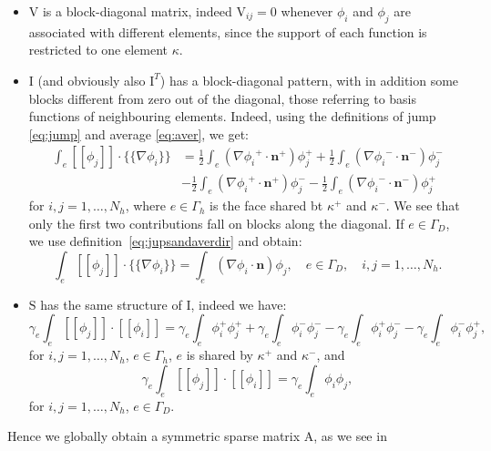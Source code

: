 \documentclass[12pt, a4paper]{article}
\theoremstyle{definition}
\theoremstyle{plain}
\theoremstyle{plain}
\theoremstyle{definition}
\begin{document}
\begin{itemize}
	\item $\mathrm{V}$ is a block-diagonal matrix, indeed 
	$\mathrm{V}_{ij} = 0$ 
	whenever $\phi_i$ and $\phi_j$ are associated with different elements, 
	since the support of each function is restricted to one element $\kappa$.
	\item $\mathrm{I}$ (and obviously also $\mathrm{I}^T$) has a block-diagonal 
	pattern, with in addition some blocks different from zero out of the 
	diagonal, those referring to basis functions of neighbouring elements. 
	Indeed, using the definitions of jump \eqref{eq:jump} and average 
	\eqref{eq:aver}, we get:
	\begin{align*}
		\int_e [\![\phi_j]\!] \cdot \{\!\!\{ \nabla \phi_i \}\!\!\} &=
		\frac{1}{2} \int_e (\nabla{\phi_i}^+ \cdot \mathbf{n}^+ )\phi_j^+
		+ \frac{1}{2} \int_e (\nabla{\phi_i}^- \cdot \mathbf{n}^- )\phi_j^-\\
		&- \frac{1}{2} \int_e (\nabla{\phi_i}^+ \cdot \mathbf{n}^+ )\phi_j^-
		- \frac{1}{2} \int_e (\nabla{\phi_i}^- \cdot \mathbf{n}^- )\phi_j^+
	\end{align*}
	for $i,j = 1,\dots, N_h$, where $e \in \Gamma_h$ is the face shared bt 
	$\kappa^+$ and $\kappa^-$. We see that only the first two contributions 
	fall on blocks along the diagonal. If $e \in \Gamma_D$, we use 
	definition~\eqref{eq:jupsandaverdir} and obtain:
	\begin{equation*}
		\int_e [\![\phi_j]\!] \cdot \{\!\!\{ \nabla \phi_i \}\!\!\} = \int_e 
		(\nabla{\phi_i} \cdot \mathbf{n} )\phi_j, \quad e \in \Gamma_{D}, 
		\quad i,j = 1,\dots, N_h.
	\end{equation*}
	\item $\mathrm{S}$ has the same structure of $\mathrm{I}$, indeed we 
	have:
	\begin{equation*}
		\gamma_e \int_e [\![\phi_j]\!] \cdot [\![\phi_i]\!] =
		\gamma_e \int_e \phi_i^+ \phi_j^+
		+ \gamma_e \int_e \phi_i^- \phi_j^-
		- \gamma_e \int_e \phi_i^+ \phi_j^-
		- \gamma_e \int_e \phi_i^- \phi_j^+,
	\end{equation*}
	for $i,j = 1,\dots, N_h$,  $e \in \Gamma_h$, $e$ is shared by $\kappa^+$ 
	and 
	$\kappa^-$, and
	\begin{equation*}
		\gamma_e \int_e [\![\phi_j]\!] \cdot [\![\phi_i]\!] =
		\gamma_e \int_e \phi_i \phi_j,
	\end{equation*}
	for $i,j = 1,\dots,N_h$, $e \in \Gamma_D$.
\end{itemize}
Hence we globally obtain a symmetric sparse matrix $\mathrm{A}$, as we see in 
\end{document}
